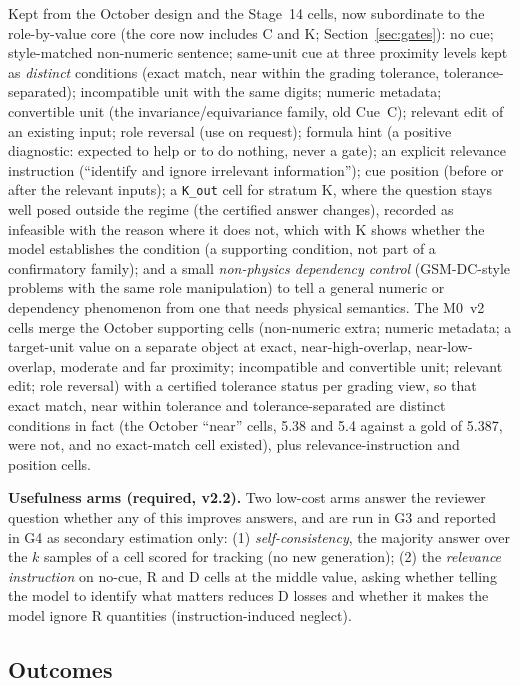 \documentclass[10pt,a4paper]{article}
\begin{document}
Kept from the October design and the Stage~14 cells, now subordinate to the role-by-value core (the core now includes C and K;
Section~\ref{sec:gates}): no cue;
style-matched non-numeric sentence; same-unit cue at three proximity levels kept as \emph{distinct} conditions
(exact match, near within the grading tolerance, tolerance-separated); incompatible unit with the same digits;
numeric metadata; convertible unit (the invariance/equivariance family, old Cue~C); relevant edit of an existing
input; role reversal (use on request); formula hint (a positive diagnostic: expected to help or to do nothing,
never a gate); an explicit relevance instruction (``identify and ignore irrelevant information''); cue position
(before or after the relevant inputs); a \texttt{K\_out} cell for stratum K, where the question stays well posed outside the
regime (the certified answer changes), recorded as infeasible with the reason where it does not, which with K shows whether
the model establishes the condition (a supporting condition, not part of a confirmatory family); and a small \emph{non-physics dependency control} (GSM-DC-style problems
with the same role manipulation) to tell a general numeric or dependency phenomenon from one that needs physical
semantics. The M0~v2 cells merge the October supporting cells (non-numeric extra; numeric metadata; a target-unit value on a
separate object at exact, near-high-overlap, near-low-overlap, moderate and far proximity; incompatible and convertible
unit; relevant edit; role reversal) with a certified tolerance status per grading view, so that exact match, near within
tolerance and tolerance-separated are distinct conditions in fact (the October ``near'' cells, 5.38 and 5.4 against a gold of
5.387, were not, and no exact-match cell existed), plus relevance-instruction and position cells.

\textbf{Usefulness arms (required, v2.2).} Two low-cost arms answer the reviewer question whether any of this improves
answers, and are run in G3 and reported in G4 as secondary estimation only: (1) \emph{self-consistency}, the majority answer
over the $k$ samples of a cell scored for tracking (no new generation); (2) the \emph{relevance instruction} on no-cue, R and D
cells at the middle value, asking whether telling the model to identify what matters reduces D losses and whether it makes the
model ignore R quantities (instruction-induced neglect).

\subsection{Outcomes}
\label{sec:outcomes}
\end{document}
